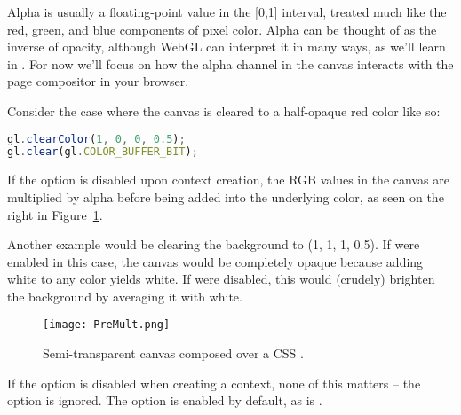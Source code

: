 Alpha is usually a floating-point value in the [0,1] interval, treated much like the red, green, and blue components of pixel color.  Alpha can be thought of as the inverse of opacity, although WebGL can interpret it in many ways, as we'll learn in .  For now we'll focus on how the alpha channel in the canvas interacts with the page compositor in your browser.

Consider the case where the canvas is cleared to a half-opaque red color like so:

\begin{lstlisting}[language=JavaScript]
gl.clearColor(1, 0, 0, 0.5);
gl.clear(gl.COLOR_BUFFER_BIT);
\end{lstlisting}

If the  option is disabled upon context creation, the RGB values in the canvas are multiplied by alpha before being added into the underlying color, as seen on the right in Figure~\ref{fig:PreMult}.

Another example would be clearing the background to (1, 1, 1, 0.5).  If  were enabled in this case, the canvas would be completely opaque because adding white to any color yields white.  If  were disabled, this would (crudely) brighten the background by averaging it with white.

\begin{figure}[htb]\centering
  \texttt{[image: PreMult.png]}
  \caption{Semi-transparent canvas composed over a CSS .}
  \label{fig:PreMult}
\end{figure}

If the  option is disabled when creating a context, none of this matters -- the  option is ignored.  The  option is enabled by default, as is .

\begin{comment}
Note that we're not addressing css-opacity.

In this book, we never add children elements to \code{<canvas>}, but there's nothing wrong with doing so.  On some platforms, this can degrade performance, although this is improving as WebGL implementations are maturing.

http://www.svgopen.org/2005/papers/abstractsvgopen/
http://stackoverflow.com/questions/9491417/when-webgl-decide-to-update-the-display?answertab=votes#tab-top

\end{comment}

